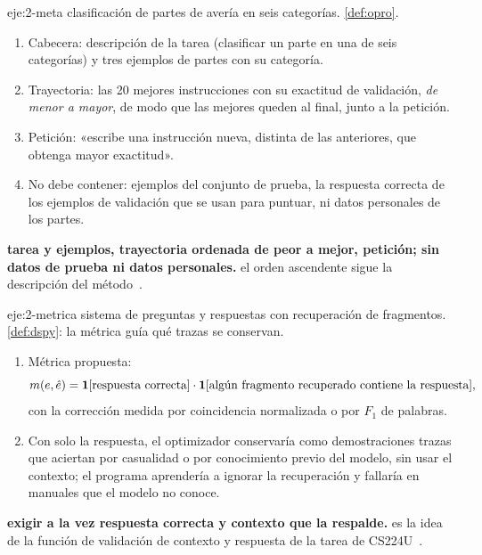\begin{solucion}{eje:2-meta}
\datos clasificación de partes de avería en seis categorías.
\planteamiento \cref{def:opro}.
\pasos
\begin{enumerate}[label=\arabic*.]
  \item Cabecera: descripción de la tarea (clasificar un parte en una de seis categorías) y tres ejemplos de partes con su categoría.
  \item Trayectoria: las 20 mejores instrucciones con su exactitud de validación, \emph{de menor a mayor}, de modo que las mejores queden al final, junto a la petición.
  \item Petición: «escribe una instrucción nueva, distinta de las anteriores, que obtenga mayor exactitud».
  \item No debe contener: ejemplos del conjunto de prueba, la respuesta correcta de los ejemplos de validación que se usan para puntuar, ni datos personales de los partes.
\end{enumerate}
\resultado \textbf{tarea y ejemplos, trayectoria ordenada de peor a mejor, petición; sin datos de prueba ni datos personales.}
\comprobacion el orden ascendente sigue la descripción del método~\cite{opro}.
\end{solucion}

\begin{solucion}{eje:2-metrica}
\datos sistema de preguntas y respuestas con recuperación de fragmentos.
\planteamiento \cref{def:dspy}: la métrica guía qué trazas se conservan.
\pasos
\begin{enumerate}[label=\arabic*.]
  \item Métrica propuesta:
  \[
  m(e,\hat e)=\mathbf{1}[\text{respuesta correcta}]\cdot\mathbf{1}[\text{algún fragmento recuperado contiene la respuesta}],
  \]
  con la corrección medida por coincidencia normalizada o por $F_1$ de palabras.
  \item Con solo la respuesta, el optimizador conservaría como demostraciones trazas que aciertan por casualidad o por conocimiento previo del modelo, sin usar el contexto; el programa aprendería a ignorar la recuperación y fallaría en manuales que el modelo no conoce.
\end{enumerate}
\resultado \textbf{exigir a la vez respuesta correcta y contexto que la respalde.}
\comprobacion es la idea de la función de validación de contexto y respuesta de la tarea de CS224U~\cite{cs224u}.
\end{solucion}

